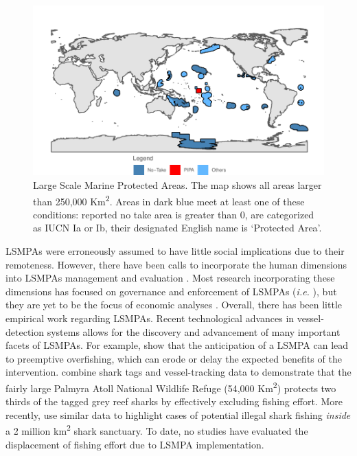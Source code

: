 \documentclass[11pt,english]{article}
\begin{document}
\begin{figure}
\centering
\includegraphics{img/LSMPAs_map.pdf}
\caption{\label{fig:LSMPAs_map}Large Scale Marine
Protected Areas. The map shows all areas larger than 250,000
Km\textsuperscript{2}. Areas in dark blue meet at least one of these
conditions: reported no take area is greater than 0, are categorized as
IUCN Ia or Ib, their designated English name is `Protected Area'.}
\end{figure}

LSMPAs were erroneously assumed to have little social implications due
to their remoteness. However, there have been calls to incorporate the
human dimensions into LSMPAs management and evaluation
\citep{agardy_2011,gray_2017}. Most research incorporating these
dimensions has focused on governance and enforcement of LSMPAs
(\emph{i.e.} \citet{alger_2017,christie_2017}), but they are yet to be
the focus of economic analyses \citep{gray_2017}. Overall, there has
been little empirical work regarding LSMPAs. Recent technological
advances in vessel-detection systems allows for the discovery and
advancement of many important facets of LSMPAs. For example,
\citet{mcdermott_2018} show that the anticipation of a LSMPA can lead to
preemptive overfishing, which can erode or delay the expected benefits
of the intervention. \citet{white_2017} combine shark tags and
vessel-tracking data to demonstrate that the fairly large Palmyra Atoll
National Wildlife Refuge (54,000 Km\textsuperscript{2}) protects two
thirds of the tagged grey reef sharks by effectively excluding fishing
effort. More recently, \citep{bradley_2018} use similar data to
highlight cases of potential illegal shark fishing \emph{inside} a 2
million km\textsuperscript{2} shark sanctuary. To date, no studies have
evaluated the displacement of fishing effort due to LSMPA
implementation.
\end{document}
